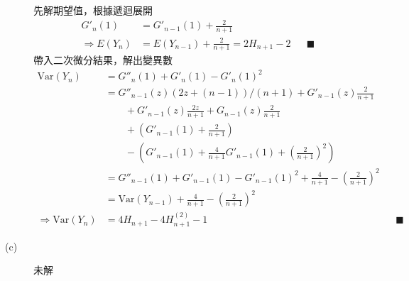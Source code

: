 \documentclass[11pt,fleqn]{article}
\begin{document}
\begin{description}
		先解期望值，根據遞迴展開
		\begin{align*}
			{G}'_n(1) &= {G}'_{n-1}(1) + \frac{2}{n+1} \\
			\Rightarrow
				E(Y_n) &= E(Y_{n-1}) + \frac{2}{n+1} = 2 H_{n+1} - 2 && \blacksquare
		\end{align*}
		帶入二次微分結果，解出變異數
		\begin{align*}
			\text{Var}(Y_n) &= {G}''_n(1) + {G}'_n(1) - {G}'_n(1)^2 \\
			&= {G}''_{n-1}(z)(2z + (n-1)) / (n+1) + {G}'_{n-1}(z) \frac{2}{n+1} \\
			& \qquad + {G}'_{n-1}(z)\frac{2z}{n+1} + G_{n-1}(z) \frac{2}{n+1} \\
			& \qquad + \left( {G}'_{n-1}(1) + \frac{2}{n+1} \right)\\
			& \qquad - \left( {G}'_{n-1}(1) + \frac{4}{n+1} {G}'_{n-1}(1) + \left(\frac{2}{n+1}\right)^2 \right) \\
			&= {G}''_{n-1}(1) + {G}'_{n-1}(1) - {G}'_{n-1}(1)^2 + \frac{4}{n+1} - \left(\frac{2}{n+1}\right)^2 \\
			&= \text{Var}(Y_{n-1}) + \frac{4}{n+1} - \left(\frac{2}{n+1}\right)^2 \\
			\Rightarrow
				\text{Var}(Y_n) &= 4 H_{n+1} - 4 H^{(2)}_{n+1} - 1 && \blacksquare
		\end{align*}
	\item[(c)] 未解
\end{description}
\end{document}
